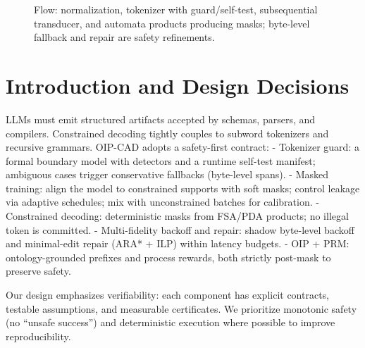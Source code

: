 \documentclass{article}
\begin{document}
\begin{figure}[h]
\centering
{}
\caption{Flow: normalization, tokenizer with guard/self-test, subsequential transducer, and automata products producing masks; byte-level fallback and repair are safety refinements.}
\end{figure}

\section{Introduction and Design Decisions}
LLMs must emit structured artifacts accepted by schemas, parsers, and compilers. Constrained decoding tightly couples to subword tokenizers and recursive grammars. OIP-CAD adopts a safety-first contract:
- Tokenizer guard: a formal boundary model with detectors and a runtime self-test manifest; ambiguous cases trigger conservative fallbacks (byte-level spans).
- Masked training: align the model to constrained supports with soft masks; control leakage via adaptive schedules; mix with unconstrained batches for calibration.
- Constrained decoding: deterministic masks from FSA/PDA products; no illegal token is committed.
- Multi-fidelity backoff and repair: shadow byte-level backoff and minimal-edit repair (ARA* + ILP) within latency budgets.
- OIP + PRM: ontology-grounded prefixes and process rewards, both strictly post-mask to preserve safety.

Our design emphasizes verifiability: each component has explicit contracts, testable assumptions, and measurable certificates. We prioritize monotonic safety (no “unsafe success”) and deterministic execution where possible to improve reproducibility.
\end{document}

